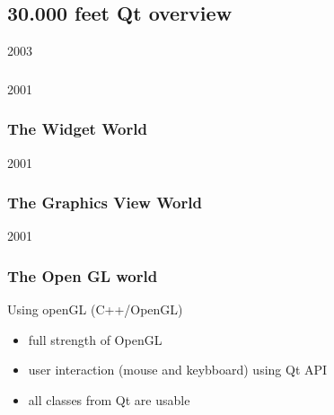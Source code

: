 %
%
%
%

\subsection{30.000 feet Qt overview}

\begin{slide}{2003}\frametitle{}
\vspace*{20mm}

\end{slide}


\begin{slide}{2001}\frametitle{The Widget World}

\end{slide}


\begin{slide}{2001}\frametitle{The Graphics View World}

\end{slide}


\begin{slide}{2001}\frametitle{The Open GL world}
\vspace*{1.5em}
Using openGL (C++/OpenGL)
\begin{itemize}
\item full strength of OpenGL
\item user interaction (mouse and keybboard) using Qt API
\item all classes from Qt are usable
\end{itemize}

\end{slide}

